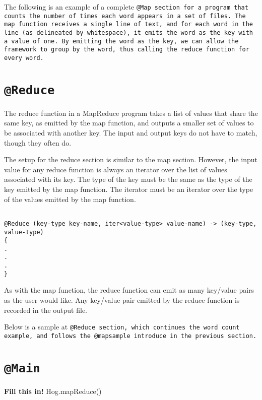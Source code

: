 \documentclass{book}
\begin{document}
The following is an example of a complete \tt @Map \rm section for a program that
counts the number of times each word appears in a set of files. The map function
receives a single line of text, and for each word in the line (as delineated by
whitespace), it emits the word as the key with a value of one. By emitting the word
as the key, we can allow the framework to group by the word, thus calling the
reduce function for every word.


\section{\tt @Reduce \rm} %
\label{sec:tt_reduce_rm}

The reduce function in a MapReduce program takes a list of values that share the
same key, as emitted by the map function, and outputs a smaller set of values to be
associated with another key. The input and output keys do not have to match, though
they often do.

The setup for the reduce section is similar to the map section. However, the input
value for any reduce function is always an iterator over the list of values
associated with its key. The type of the key must be the same as the type of the
key emitted by the map function. The iterator must be an iterator over the type of
the values emitted by the map function.

\begin{verbatim}

@Reduce (key-type key-name, iter<value-type> value-name) -> (key-type, value-type)
{
.
.
.
}
\end{verbatim}

As with the map function, the reduce function can emit as many key/value pairs as
the user would like. Any key/value pair emitted by the reduce function is recorded
in the output file.

Below is a sample at \tt @Reduce \rm section, which continues the word count
example, and follows the @mapsample introduce in the previous section.


\section{\tt @Main \rm} %
\label{sec:tt_main_rm}

\textbf{Fill this in!} Hog.mapReduce()
\end{document}
